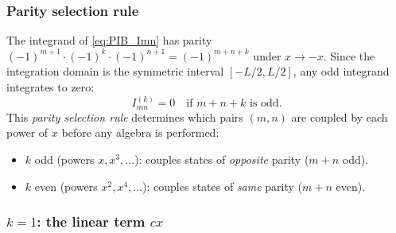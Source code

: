 \subsubsection{Parity selection rule}\label{sec:PIB_parity_sel}

The integrand of \cref{eq:PIB_Imn} has parity
$(-1)^{m+1}\cdot(-1)^k\cdot(-1)^{n+1} = (-1)^{m+n+k}$ under $x \to -x$.
Since the integration domain is the symmetric interval $[-L/2, L/2]$, any odd
integrand integrates to zero:
\begin{equation}\label{eq:PIB_sel}
  \boxed{I_{mn}^{(k)} = 0\quad\text{if }m + n + k\text{ is odd.}}
\end{equation}
This \emph{parity selection rule} determines which pairs $(m,n)$ are coupled by
each power of $x$ before any algebra is performed:
\begin{itemize}
  \item $k$ odd (powers $x, x^3, \ldots$): couples states of \emph{opposite} parity ($m+n$ odd).
  \item $k$ even (powers $x^2, x^4, \ldots$): couples states of \emph{same} parity ($m+n$ even).
\end{itemize}

\subsubsection{$k = 1$: the linear term $cx$}\label{sec:PIB_k1}

